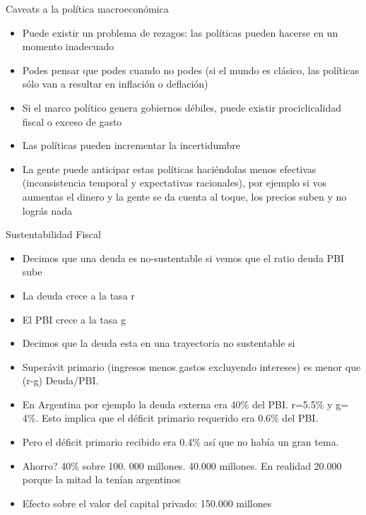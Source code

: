 \documentclass{beamer}
\begin{document}
\begin{frame}{Caveats a la política macroeconómica}

    \begin{itemize}
    \item Puede existir un problema de rezagos: las políticas pueden hacerse en un momento inadecuado
    \item Podes pensar que podes cuando no podes (si el mundo es clásico, las políticas sólo van a resultar en inflación o deflación)
    \item Si el marco político genera gobiernos débiles, puede existir prociclicalidad fiscal o exceso de gasto
    \item Las políticas pueden incrementar la incertidumbre
    \item La gente puede anticipar estas políticas haciéndolas menos efectivas (inconsistencia temporal y expectativas racionales), por ejemplo si vos aumentas el dinero y la gente se da cuenta al toque, los precios suben y no lográs nada
    \end{itemize}

\end{frame}




\begin{frame}{Sustentabilidad Fiscal}

    \begin{itemize}
    \item Decimos que una deuda es no-sustentable si vemos que el ratio deuda PBI sube
     \item La deuda crece a la tasa r
      \item El PBI crece a la tasa g
       \item Decimos que la deuda esta en una trayectoria no sustentable si  
        \item Superávit primario (ingresos menos gastos excluyendo intereses) es menor que (r-g) Deuda/PBI. 
     \item En Argentina por ejemplo la deuda externa era 40\% del PBI. r=5.5\% y g= 4\%. Esto implica que el déficit primario requerido era 0.6\% del PBI. 
    \item Pero el déficit primario recibido era 0.4\% así que no había un gran tema.
    \item Ahorro? 40\% sobre 100. 000 millones. 40.000 millones. En realidad 20.000 porque la mitad la tenían argentinos
     \item Efecto sobre el valor del capital privado: 150.000 millones
    \end{itemize}

\end{frame}
\end{document}
